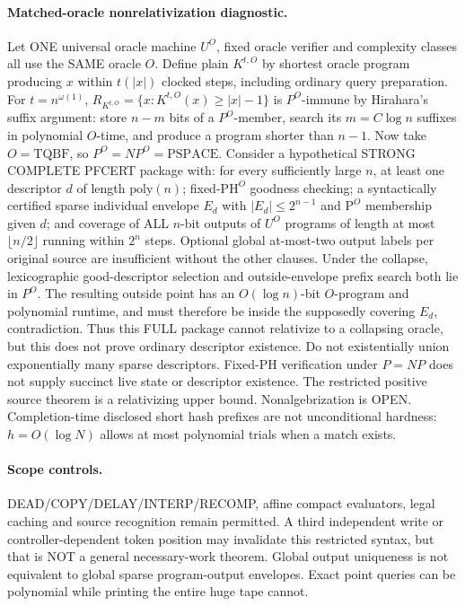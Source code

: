 \documentclass[11pt]{article}
\begin{document}
\paragraph{Matched-oracle nonrelativization diagnostic.}
Let ONE universal oracle machine $U^O$, fixed oracle verifier and complexity classes all use the SAME oracle $O$. Define plain $K^{t,O}$ by shortest oracle program producing $x$ within $t(|x|)$ clocked steps, including ordinary query preparation. For $t=n^{\omega(1)}$, $R_{K^{t,O}}=\{x:K^{t,O}(x)\ge|x|-1\}$ is $P^O$-immune by Hirahara's suffix argument: store $n-m$ bits of a $P^O$-member, search its $m=C\log n$ suffixes in polynomial $O$-time, and produce a program shorter than $n-1$. Now take $O=\mathrm{TQBF}$, so $P^O=NP^O=\mathrm{PSPACE}$. Consider a hypothetical STRONG COMPLETE PFCERT package with: for every sufficiently large $n$, at least one descriptor $d$ of length $\mathrm{poly}(n)$; fixed-$\mathrm{PH}^O$ goodness checking; a syntactically certified sparse individual envelope $E_d$ with $|E_d|\le2^{n-1}$ and $\mathrm{P}^O$ membership given $d$; and coverage of ALL $n$-bit outputs of $U^O$ programs of length at most $\lfloor n/2\rfloor$ running within $2^n$ steps. Optional global at-most-two output labels per original source are insufficient without the other clauses. Under the collapse, lexicographic good-descriptor selection and outside-envelope prefix search both lie in $P^O$. The resulting outside point has an $O(\log n)$-bit $O$-program and polynomial runtime, and must therefore be inside the supposedly covering $E_d$, contradiction. Thus this FULL package cannot relativize to a collapsing oracle, but this does not prove ordinary descriptor existence. Do not existentially union exponentially many sparse descriptors. Fixed-PH verification under $P=NP$ does not supply succinct live state or descriptor existence. The restricted positive source theorem is a relativizing upper bound. Nonalgebrization is OPEN. Completion-time disclosed short hash prefixes are not unconditional hardness: $h=O(\log N)$ allows at most polynomial trials when a match exists.
\paragraph{Scope controls.}
DEAD/COPY/DELAY/INTERP/RECOMP, affine compact evaluators, legal caching and source recognition remain permitted. A third independent write or controller-dependent token position may invalidate this restricted syntax, but that is NOT a general necessary-work theorem. Global output uniqueness is not equivalent to global sparse program-output envelopes. Exact point queries can be polynomial while printing the entire huge tape cannot.
\end{document}
